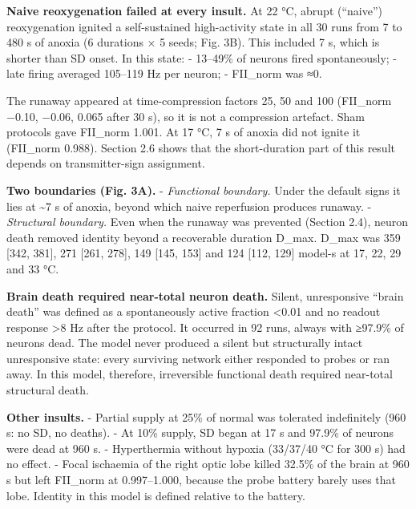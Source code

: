 \documentclass[11pt]{article}
\begin{document}
\textbf{Naive reoxygenation failed at every insult.} At 22 °C, abrupt (``naive'') reoxygenation ignited a self-sustained high-activity state in all 30 runs from 7 to 480 s of anoxia (6 durations × 5 seeds; Fig. 3B). This included 7 s, which is shorter than SD onset. In this state:
- 13--49\% of neurons fired spontaneously;
- late firing averaged 105--119 Hz per neuron;
- FII\_norm was ≈0.

The runaway appeared at time-compression factors 25, 50 and 100 (FII\_norm −0.10, −0.06, 0.065 after 30 s), so it is not a compression artefact. Sham protocols gave FII\_norm 1.001. At 17 °C, 7 s of anoxia did not ignite it (FII\_norm 0.988). Section 2.6 shows that the short-duration part of this result depends on transmitter-sign assignment.

\textbf{Two boundaries (Fig. 3A).}
- \emph{Functional boundary.} Under the default signs it lies at \textasciitilde7 s of anoxia, beyond which naive reperfusion produces runaway.
- \emph{Structural boundary.} Even when the runaway was prevented (Section 2.4), neuron death removed identity beyond a recoverable duration D\_max. D\_max was 359 {[}342, 381{]}, 271 {[}261, 278{]}, 149 {[}145, 153{]} and 124 {[}112, 129{]} model-s at 17, 22, 29 and 33 °C.

\textbf{Brain death required near-total neuron death.} Silent, unresponsive ``brain death'' was defined as a spontaneously active fraction \textless0.01 and no readout response \textgreater8 Hz after the protocol. It occurred in 92 runs, always with ≥97.9\% of neurons dead. The model never produced a silent but structurally intact unresponsive state: every surviving network either responded to probes or ran away. In this model, therefore, irreversible functional death required near-total structural death.

\textbf{Other insults.}
- Partial supply at 25\% of normal was tolerated indefinitely (960 s: no SD, no deaths).
- At 10\% supply, SD began at 17 s and 97.9\% of neurons were dead at 960 s.
- Hyperthermia without hypoxia (33/37/40 °C for 300 s) had no effect.
- Focal ischaemia of the right optic lobe killed 32.5\% of the brain at 960 s but left FII\_norm at 0.997--1.000, because the probe battery barely uses that lobe. Identity in this model is defined relative to the battery.
\end{document}
